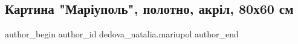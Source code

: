  
 
 
 
 

\subsection{Картина "Маріуполь", полотно, акріл, 80х60 см}
\label{sec:24_09_2022.fb.dedova_natalia.mariupol.1.kartina__mar_upol___}

\ifcmt
 author_begin
   author_id dedova_natalia.mariupol
 author_end
\fi
